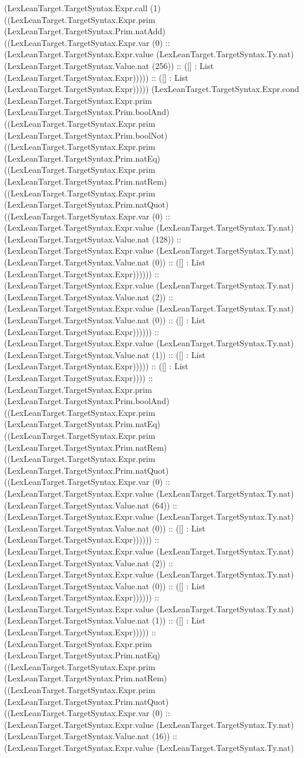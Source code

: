 \documentclass[11pt]{article}
\begin{document}
(LexLeanTarget.TargetSyntax.Expr.call (1) ((LexLeanTarget.TargetSyntax.Expr.prim (LexLeanTarget.TargetSyntax.Prim.natAdd) ((LexLeanTarget.TargetSyntax.Expr.var (0) :: (LexLeanTarget.TargetSyntax.Expr.value (LexLeanTarget.TargetSyntax.Ty.nat) (LexLeanTarget.TargetSyntax.Value.nat (256)) :: ([] : List (LexLeanTarget.TargetSyntax.Expr))))) :: ([] : List (LexLeanTarget.TargetSyntax.Expr))))) (LexLeanTarget.TargetSyntax.Expr.cond (LexLeanTarget.TargetSyntax.Expr.prim (LexLeanTarget.TargetSyntax.Prim.boolAnd) ((LexLeanTarget.TargetSyntax.Expr.prim (LexLeanTarget.TargetSyntax.Prim.boolNot) ((LexLeanTarget.TargetSyntax.Expr.prim (LexLeanTarget.TargetSyntax.Prim.natEq) ((LexLeanTarget.TargetSyntax.Expr.prim (LexLeanTarget.TargetSyntax.Prim.natRem) ((LexLeanTarget.TargetSyntax.Expr.prim (LexLeanTarget.TargetSyntax.Prim.natQuot) ((LexLeanTarget.TargetSyntax.Expr.var (0) :: (LexLeanTarget.TargetSyntax.Expr.value (LexLeanTarget.TargetSyntax.Ty.nat) (LexLeanTarget.TargetSyntax.Value.nat (128)) :: (LexLeanTarget.TargetSyntax.Expr.value (LexLeanTarget.TargetSyntax.Ty.nat) (LexLeanTarget.TargetSyntax.Value.nat (0)) :: ([] : List (LexLeanTarget.TargetSyntax.Expr)))))) :: (LexLeanTarget.TargetSyntax.Expr.value (LexLeanTarget.TargetSyntax.Ty.nat) (LexLeanTarget.TargetSyntax.Value.nat (2)) :: (LexLeanTarget.TargetSyntax.Expr.value (LexLeanTarget.TargetSyntax.Ty.nat) (LexLeanTarget.TargetSyntax.Value.nat (0)) :: ([] : List (LexLeanTarget.TargetSyntax.Expr)))))) :: (LexLeanTarget.TargetSyntax.Expr.value (LexLeanTarget.TargetSyntax.Ty.nat) (LexLeanTarget.TargetSyntax.Value.nat (1)) :: ([] : List (LexLeanTarget.TargetSyntax.Expr))))) :: ([] : List (LexLeanTarget.TargetSyntax.Expr)))) :: (LexLeanTarget.TargetSyntax.Expr.prim (LexLeanTarget.TargetSyntax.Prim.boolAnd) ((LexLeanTarget.TargetSyntax.Expr.prim (LexLeanTarget.TargetSyntax.Prim.natEq) ((LexLeanTarget.TargetSyntax.Expr.prim (LexLeanTarget.TargetSyntax.Prim.natRem) ((LexLeanTarget.TargetSyntax.Expr.prim (LexLeanTarget.TargetSyntax.Prim.natQuot) ((LexLeanTarget.TargetSyntax.Expr.var (0) :: (LexLeanTarget.TargetSyntax.Expr.value (LexLeanTarget.TargetSyntax.Ty.nat) (LexLeanTarget.TargetSyntax.Value.nat (64)) :: (LexLeanTarget.TargetSyntax.Expr.value (LexLeanTarget.TargetSyntax.Ty.nat) (LexLeanTarget.TargetSyntax.Value.nat (0)) :: ([] : List (LexLeanTarget.TargetSyntax.Expr)))))) :: (LexLeanTarget.TargetSyntax.Expr.value (LexLeanTarget.TargetSyntax.Ty.nat) (LexLeanTarget.TargetSyntax.Value.nat (2)) :: (LexLeanTarget.TargetSyntax.Expr.value (LexLeanTarget.TargetSyntax.Ty.nat) (LexLeanTarget.TargetSyntax.Value.nat (0)) :: ([] : List (LexLeanTarget.TargetSyntax.Expr)))))) :: (LexLeanTarget.TargetSyntax.Expr.value (LexLeanTarget.TargetSyntax.Ty.nat) (LexLeanTarget.TargetSyntax.Value.nat (1)) :: ([] : List (LexLeanTarget.TargetSyntax.Expr))))) :: (LexLeanTarget.TargetSyntax.Expr.prim (LexLeanTarget.TargetSyntax.Prim.natEq) ((LexLeanTarget.TargetSyntax.Expr.prim (LexLeanTarget.TargetSyntax.Prim.natRem) ((LexLeanTarget.TargetSyntax.Expr.prim (LexLeanTarget.TargetSyntax.Prim.natQuot) ((LexLeanTarget.TargetSyntax.Expr.var (0) :: (LexLeanTarget.TargetSyntax.Expr.value (LexLeanTarget.TargetSyntax.Ty.nat) (LexLeanTarget.TargetSyntax.Value.nat (16)) :: (LexLeanTarget.TargetSyntax.Expr.value (LexLeanTarget.TargetSyntax.Ty.nat) 
\end{document}
